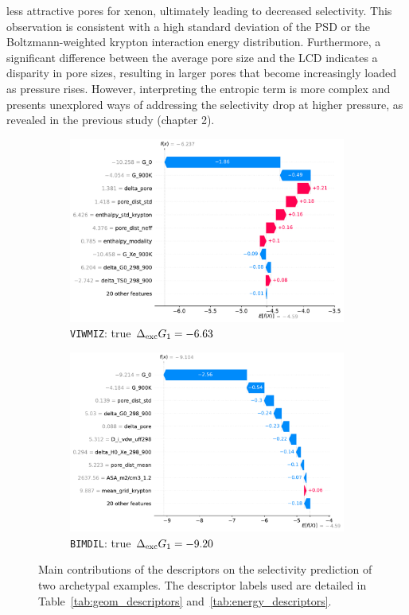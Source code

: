 \documentclass[main]{subfiles}
\begin{document}
less attractive pores for xenon, ultimately leading to decreased selectivity. This observation is consistent with a high standard deviation of the PSD or the Boltzmann-weighted krypton interaction energy distribution. Furthermore, a significant difference between the average pore size and the LCD indicates a disparity in pore sizes, resulting in larger pores that become increasingly loaded as pressure rises. However, interpreting the entropic term is more complex and presents unexplored ways of addressing the selectivity drop at higher pressure, as revealed in the previous study (chapter 2).

\begin{figure}[ht]
    \centering
    \begin{subfigure}[b]{0.47\textwidth}
      \centering
      \includegraphics[width=\textwidth]{figures/4-ml/main/VIWMIZ_clean.pdf}
      \caption{\texttt{VIWMIZ}: true $\Delta_{\text{exc}} G_1=-6.63$}
    \end{subfigure}
         \hfill
    \begin{subfigure}[b]{0.47\textwidth}
      \centering
      \includegraphics[width=\textwidth]{figures/4-ml/main/BIMDIL_clean.pdf}
      \caption{\texttt{BIMDIL}: true $\Delta_{\text{exc}} G_1=-9.20$}
    \end{subfigure}
  \caption{Main contributions of the descriptors on the selectivity prediction of two archetypal examples. The descriptor labels used are detailed in Table~\ref{tab:geom_descriptors} and~\ref{tab:energy_descriptors}.}\label{fgr:contribution}
\end{figure}
\end{document}
